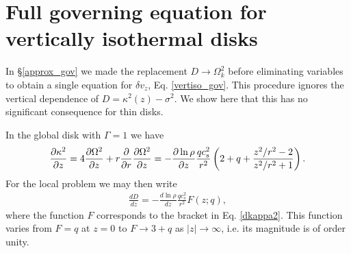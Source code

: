 \section{Full governing equation for vertically isothermal disks}\label{adia_improve}
In \S\ref{approx_gov} we made the replacement $D\to\Omega_k^2$ before
eliminating variables to obtain a single equation for $\delta v_z$,
Eq. \ref{vertiso_gov}.  This procedure ignores the vertical dependence of
$D=\kappa^2(z) - \sigma^2$. We show here that this has no significant
consequence for thin disks. 

In the global disk with $\Gamma=1$ we have
\begin{align}\label{dkappa2}
  \frac{\partial\kappa^2}{\partial z} = 4 \frac{\partial\Omega^2}{\partial z} + r\frac{\partial}{\partial
    r}\frac{\partial\Omega^2}{\partial z} = -
  \frac{\partial\ln\rho}{\partial z}\frac{qc_s^2}{r^2} \left(2 + q +
    \frac{z^2/r^2-2}{z^2/r^2+1}\right). 
\end{align}
For the local problem we may then write
\begin{align}
  \frac{dD}{dz}  = - \frac{d\ln\rho}{dz}\frac{qc_s^2}{r^2}F(z;q),
\end{align}
where the function $F$ corresponds to the bracket in
Eq. \ref{dkappa2}. This function varies from $F=q$ at $z=0$ to $F\to
3+q$ as $|z|\to\infty$, i.e. its magnitude is of order unity. 

